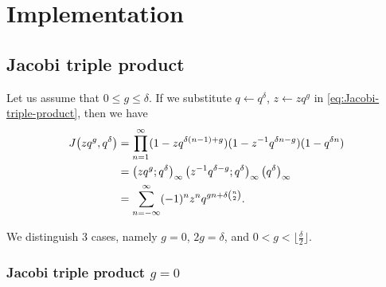 \documentclass{article}
\begin{document}
\section{Implementation}



\subsection{Jacobi triple product}

Let us assume that $0 \le g \le \delta$. If we substitute
$q \gets q^\delta$, $z \gets z q^g$ in
\eqref{eq:Jacobi-triple-product}, then we have
\begin{align*}
  J\!\left(zq^g,q^\delta\right)
  &=
  \prod_{n=1}^\infty
    (1-zq^{\delta (n-1)+g})
    (1-z^{-1}q^{\delta n-g})
    (1-q^{\delta n})
  \\
  &=
    \left( zq^g;q^\delta \right)_{\infty} \left( z^{-1}q^{\delta-g};q^\delta \right)_{\infty}
    \left({q}^{\delta}\right)_{\infty}
  \\
  &=
    \sum_{n=-\infty}^\infty (-1)^nz^nq^{gn + \delta \binom{n}{2}}.
\end{align*}

We distinguish 3 cases, namely $g=0$, $2g=\delta$, and
$0 < g < \lfloor \frac{\delta}{2}\rfloor$.



\subsubsection{Jacobi triple product $g=0$}
\end{document}
